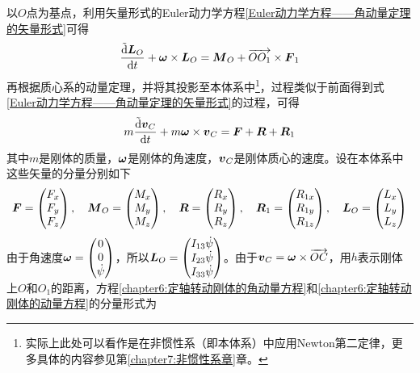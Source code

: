 以$O$点为基点，利用矢量形式的Euler动力学方程\eqref{Euler动力学方程——角动量定理的矢量形式}可得
\begin{equation}
	\frac{\tilde{\mathrm{d}} \boldsymbol{L}_O}{\mathrm{d} t} + \boldsymbol{\omega} \times \boldsymbol{L}_O = \boldsymbol{M}_O+\overrightarrow{OO_1}\times \boldsymbol{F}_1
	\label{chapter6:定轴转动刚体的角动量方程}
\end{equation}
再根据质心系的动量定理，并将其投影至本体系中\footnote{实际上此处可以看作是在非惯性系（即本体系）中应用Newton第二定律，更多具体的内容参见第\ref{chapter7:非惯性系章}章。}，过程类似于前面得到式\eqref{Euler动力学方程——角动量定理的矢量形式}的过程，可得
\begin{equation}
	m\frac{\tilde{\mathrm{d}} \boldsymbol{v}_C}{\mathrm{d} t} + m\boldsymbol{\omega} \times \boldsymbol{v}_C = \boldsymbol{F}+\boldsymbol{R}+\boldsymbol{R}_1
	\label{chapter6:定轴转动刚体的动量方程}
\end{equation}
其中$m$是刚体的质量，$\boldsymbol{\omega}$是刚体的角速度，$\boldsymbol{v}_C$是刚体质心的速度。设在本体系中这些矢量的分量分别如下
\begin{align*}
	\boldsymbol{F}=\begin{pmatrix} F_x \\ F_y \\ F_z \end{pmatrix},\quad \boldsymbol{M}_O=\begin{pmatrix} M_x \\ M_y \\ M_z \end{pmatrix},\quad \boldsymbol{R}=\begin{pmatrix} R_x \\ R_y \\ R_z \end{pmatrix},\quad \boldsymbol{R}_1=\begin{pmatrix} R_{1x} \\ R_{1y} \\ R_{1z} \end{pmatrix},\quad \boldsymbol{L}_O=\begin{pmatrix} L_x \\ L_y \\ L_z \end{pmatrix}
\end{align*}
由于角速度$\boldsymbol{\omega}=\begin{pmatrix} 0 \\ 0 \\ \dot{\psi} \end{pmatrix}$，所以$\boldsymbol{L}_O=\begin{pmatrix} I_{13}\dot{\psi} \\ I_{23}\dot{\psi} \\ I_{33}\dot{\psi} \end{pmatrix}$。由于$\boldsymbol{v}_C=\boldsymbol{\omega}\times\overrightarrow{OC}$，用$h$表示刚体上$O$和$O_1$的距离，方程\eqref{chapter6:定轴转动刚体的角动量方程}和\eqref{chapter6:定轴转动刚体的动量方程}的分量形式为
